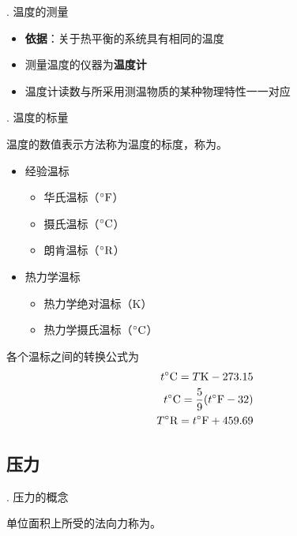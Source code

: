 . 温度的测量
\begin{itemize}
	\item \textbf{依据}：关于热平衡的系统具有相同的温度
	\item 测量温度的仪器为\textbf{温度计}
	\item 温度计读数与所采用测温物质的某种物理特性一一对应
\end{itemize}

. 温度的标量

温度的数值表示方法称为温度的标度，称为。

\begin{itemize}
	\item 经验温标
	\begin{itemize}
		\item 华氏温标（${}^{\circ} \text{F}$）
		\item 摄氏温标（${}^{\circ} \text{C}$）
		\item 朗肯温标（${}^{\circ} \text{R}$）
	\end{itemize}
	\item 热力学温标
	\begin{itemize}
		\item 热力学绝对温标（K）
		\item 热力学摄氏温标（${}^{\circ} \text{C}$）
	\end{itemize}
\end{itemize}

各个温标之间的转换公式为
\begin{align}
	t{}^{\circ} \text{C} = T \text{K} -273.15\\
	t{}^{\circ} \text{C} =  \dfrac{5}{9}(t{}^{\circ} \text{F} -32)\\
	T{}^{\circ} \text{R} = t{}^{\circ} \text{F} +459.69
\end{align}


\subsection{压力}
. 压力的概念

{
单位面积上所受的法向力称为。\\}

